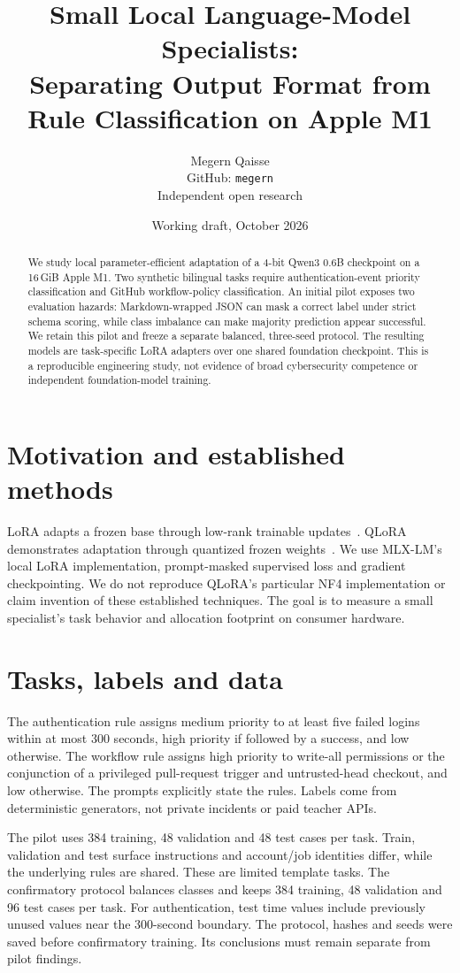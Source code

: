\documentclass[11pt]{article}
\title{Small Local Language-Model Specialists:\\Separating Output Format from Rule Classification on Apple M1}
\author{Megern Qaisse\\GitHub: \texttt{megern}\\Independent open research}
\date{Working draft, October 2026}
\begin{document}
\maketitle
\begin{abstract}
We study local parameter-efficient adaptation of a 4-bit Qwen3 0.6B checkpoint on a 16\,GiB Apple M1. Two synthetic bilingual tasks require authentication-event priority classification and GitHub workflow-policy classification. An initial pilot exposes two evaluation hazards: Markdown-wrapped JSON can mask a correct label under strict schema scoring, while class imbalance can make majority prediction appear successful. We retain this pilot and freeze a separate balanced, three-seed protocol. The resulting models are task-specific LoRA adapters over one shared foundation checkpoint. This is a reproducible engineering study, not evidence of broad cybersecurity competence or independent foundation-model training.
\end{abstract}

\section{Motivation and established methods}
LoRA adapts a frozen base through low-rank trainable updates~\cite{lora}. QLoRA demonstrates adaptation through quantized frozen weights~\cite{qlora}. We use MLX-LM's local LoRA implementation, prompt-masked supervised loss and gradient checkpointing. We do not reproduce QLoRA's particular NF4 implementation or claim invention of these established techniques. The goal is to measure a small specialist's task behavior and allocation footprint on consumer hardware.

\section{Tasks, labels and data}
The authentication rule assigns medium priority to at least five failed logins within at most 300 seconds, high priority if followed by a success, and low otherwise. The workflow rule assigns high priority to write-all permissions or the conjunction of a privileged pull-request trigger and untrusted-head checkout, and low otherwise. The prompts explicitly state the rules. Labels come from deterministic generators, not private incidents or paid teacher APIs.

The pilot uses 384 training, 48 validation and 48 test cases per task. Train, validation and test surface instructions and account/job identities differ, while the underlying rules are shared. These are limited template tasks. The confirmatory protocol balances classes and keeps 384 training, 48 validation and 96 test cases per task. For authentication, test time values include previously unused values near the 300-second boundary. The protocol, hashes and seeds were saved before confirmatory training. Its conclusions must remain separate from pilot findings.
\end{document}
